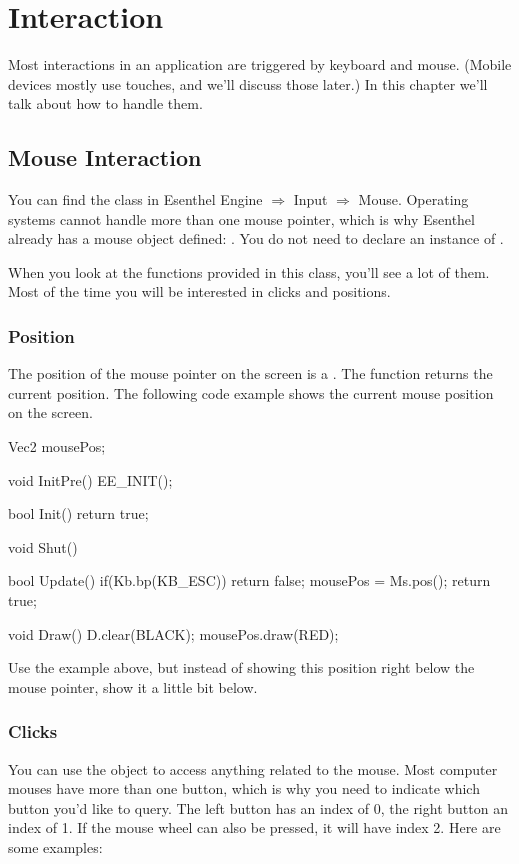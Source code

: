 \chapter{Interaction}
Most interactions in an application are triggered by keyboard and mouse. (Mobile devices mostly use touches, and we'll discuss those later.) In this chapter we'll talk about how to handle them.

\section{Mouse Interaction}
You can find the class  in Esenthel Engine $\Rightarrow$ Input $\Rightarrow$ Mouse. Operating systems cannot handle more than one mouse pointer, which is why Esenthel already has a mouse object defined: . You do not need to declare an instance of .

When you look at the functions provided in this class, you'll see a lot of them. Most of the time you will be interested in clicks and positions.

\subsection{Position}
The position of the mouse pointer on the screen is a . The function  returns the current position. The following code example shows the current mouse position on the screen. 


\begin{code}
Vec2 mousePos;

void InitPre()
{
   EE_INIT();
}

bool Init()
{   
   return true;
}

void Shut() {}

bool Update()
{
   if(Kb.bp(KB_ESC)) return false;  
   mousePos = Ms.pos();  
   return true;
}

void Draw()
{
   D.clear(BLACK);
   mousePos.draw(RED);
}
\end{code}

\begin{exercise}
Use the example above, but instead of showing this position right below the mouse pointer, show it a little bit below.
\end{exercise} 


\subsection{Clicks}
You can use the  object to access anything related to the mouse. Most computer mouses have more than one button, which is why you need to indicate which button you'd like to query. The left button has an index of 0, the right button an index of 1. If the mouse wheel can also be pressed, it will have index 2. Here are some examples: 

